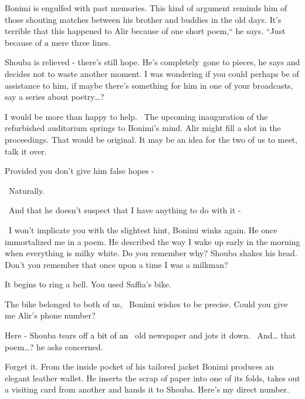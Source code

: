 \documentclass[letterpaper]{article}
\begin{document}
Bonimi is engulfed with past memories. This kind of argument reminds him of those shouting matches between his brother
and buddies in the old days. It's terrible that this happened to Alir because of one short poem,`` he says. ``Just
because of\textcolor{red}{ }\textcolor{black}{a }mere three lines.{\textquotedbl}{\textquotedbl}

Shouba is relieved - there's still hope. {\textquotedbl}He's completely~gone to pieces,{\textquotedbl} he says and
decides not to waste another moment. {\textquotedbl}I was wondering if you could perhaps be of assistance to him, if
maybe there's something for him in one of your broadcasts, say a series about poetry{\dots}?{\textquotedbl}

{\textquotedbl}I would be more than happy to help.{\textquotedbl} \ The upcoming inauguration of the refurbished
auditorium springs to Bonimi's mind. Alir might fill a slot in the proceedings. That would be original.
{\textquotedbl}It may be an idea for the two of us to meet, talk it over.{\textquotedbl}

{\textquotedbl}Provided you don't give him false hopes -{\textquotedbl}

~{\textquotedbl}Naturally.{\textquotedbl}

~{\textquotedbl}And that he doesn't suspect that I have anything to do with it -{\textquotedbl}

~{\textquotedbl}I won't implicate you with the slightest hint,{\textquotedbl} Bonimi winks again. {\textquotedbl}He once
immortalized me in a poem. He described the way I wake up early in the morning when everything is milky white. Do you
remember why?{\textquotedbl} Shouba shakes his head. {\textquotedbl}Don't you remember that once upon a time I was a
milkman?{\textquotedbl}

{\textquotedbl}It begins to ring a bell. You used Saffia's bike.{\textquotedbl}

{\textquotedbl}The bike belonged to both of us,{\textquotedbl} \ Bonimi wishes to be precise. {\textquotedbl}Could you
give me Alir's phone number?{\textquotedbl}

{\textquotedbl}Here -{\textquotedbl} Shouba tears off \textcolor{black}{a bit of an \ }old newspaper and jots it down.
\ {\textquotedbl}And{\dots} that poem{\dots}?{\textquotedbl} he asks concerned.

{\textquotedbl}Forget it.{\textquotedbl} From the inside pocket of his tailored jacket Bonimi produces an elegant
leather wallet. He inserts the scrap of paper into one of its folds, takes out a visiting card from another and hands
it to Shouba. {\textquotedbl}Here's my direct number.{\textquotedbl}
\end{document}
